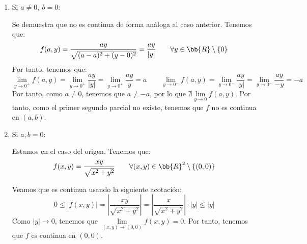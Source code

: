 \begin{ejercicio}
\begin{enumerate}
    \item Si $a\neq 0,~b=0$:
    
    Se demuestra que no es continua de forma análoga al caso anterior. Tenemos que:
    \begin{equation*}
        f(a,y)= \frac{ay}{\sqrt{(a-a)^2 + (y-0)^2}} = \frac{ay}{|y|}
         \qquad \forall y\in \bb{R}\setminus \{0\}
    \end{equation*}
    Por tanto, tenemos que:
    \begin{equation*}
        \lim_{y\to 0^+}f(a,y)=\lim_{y\to 0^+}\frac{ay}{|y|} = \lim_{y\to 0^+}\frac{ay}{y} = a
        \qquad
        \lim_{y\to 0^-}f(a,y)=\lim_{y\to 0^-}\frac{ay}{|y|} = \lim_{y\to 0^-}\frac{ay}{-y} = -a
    \end{equation*}
    Por tanto, como $a\neq 0$, tenemos que $a\neq -a$, por lo que $\nexists \lim\limits_{y\to 0}f(a,y)$. Por tanto,
    como el primer segundo parcial no existe, tenemos que $f$ no es continua en $(a,b)$.

    \item Si $a,b=0$:
    
    Estamos en el caso del origen. Tenemos que:
    \begin{equation*}
        f(x,y)= \frac{xy}{\sqrt{x^2 + y^2}} \qquad \forall (x,y)\in \bb{R}^2\setminus \{(0,0)\}
    \end{equation*}

    Veamos que es continua usando la siguiente acotación:
    \begin{equation*}
        0\leq |f(x,y)| =\left|\frac{xy}{\sqrt{x^2 + y^2}}\right| = \left|\frac{x}{\sqrt{x^2 + y^2}}\right|\cdot |y| \leq |y|
    \end{equation*}
    Como $|y|\to 0$, tenemos que $\lim\limits_{(x,y)\to (0,0)}f(x,y)=0$. Por tanto, tenemos que $f$ es continua en $(0,0)$.
    
    
\end{enumerate}
    
\end{ejercicio}